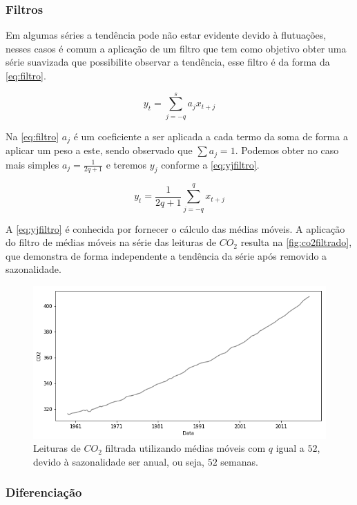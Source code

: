\documentclass[
	12pt,
	oneside,
	a4paper,
	english,
	brazil
]{abntex2}
\begin{document}
\subsubsection{Filtros}

Em algumas séries a tendência pode não estar evidente devido à flutuações, 
nesses casos é comum a aplicação de um filtro que tem como objetivo obter uma 
série suavizada que possibilite observar a tendência, esse filtro é da forma da 
\autoref{eq:filtro}\cite{ehlers}.

\begin{equation}
    \label{eq:filtro}
    y_t = \sum_{j = -q}^{s}{a_{j}x_{t+j}}
\end{equation}

Na \autoref{eq:filtro} $a_j$ é um coeficiente a ser aplicada a cada termo da 
soma de forma a aplicar um peso a este, sendo observado que $\sum{a_j} = 1$.
Podemos obter no caso mais simples $a_j = \frac{1}{2q + 1}$ e teremos $y_j$ 
conforme a \autoref{eq:yjfiltro}.

\begin{equation}
    \label{eq:yjfiltro}
    y_t = \frac{1}{2q + 1}\sum_{j=-q}^{q}{x_{t+j}}
\end{equation}

A \autoref{eq:yjfiltro} é conhecida por fornecer o cálculo das médias móveis. A 
aplicação do filtro de médias móveis na série das leituras de $CO_2$ resulta na 
\autoref{fig:co2filtrado}, que demonstra de forma independente a tendência da 
série após removido a sazonalidade.

\begin{figure}
    \centering
    \caption{Leituras de $CO_2$ filtrada utilizando médias móveis com $q$ igual a 
    $52$, devido à sazonalidade ser anual, ou seja, $52$ 
    semanas.}\label{fig:co2filtrado}
    \includegraphics[width=.6\linewidth]{images/co2_filtered.png}
\end{figure}

\subsubsection{Diferenciação}\label{sec:diff}
\end{document}
